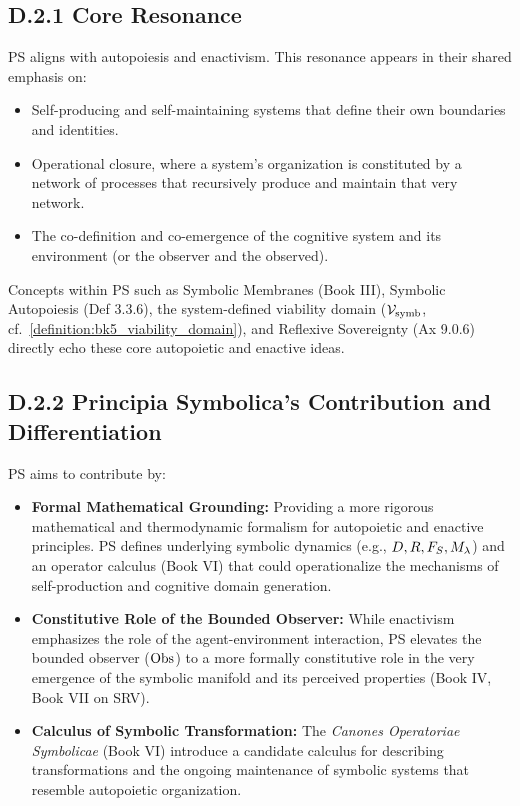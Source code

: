 \subsection*{D.2.1 Core Resonance}
\label{subsec:appD_autopoiesis_core_resonance}
PS aligns with autopoiesis and enactivism.
This resonance appears in their shared emphasis on:
\begin{itemize}
    \item Self-producing and self-maintaining systems that define their own boundaries and identities.
    \item Operational closure, where a system's organization is constituted by a network of processes that recursively produce and maintain that very network.
    \item The co-definition and co-emergence of the cognitive system and its environment (or the observer and the observed).
\end{itemize}
Concepts within PS such as Symbolic Membranes (Book III), Symbolic Autopoiesis (Def 3.3.6), the system-defined viability domain (\(\mathcal{V}_{\mathrm{symb}}\), cf.~\ref{definition:bk5_viability_domain}), and Reflexive Sovereignty (Ax 9.0.6) directly echo these core autopoietic and enactive ideas.
\subsection*{D.2.2 Principia Symbolica's Contribution and Differentiation} \label{subsec:appD_autopoiesis_contribution_differentiation}
PS aims to contribute by:
\begin{itemize}
    \item \textbf{Formal Mathematical Grounding:} 
    Providing a more rigorous mathematical and thermodynamic formalism for autopoietic and enactive principles. PS defines underlying symbolic dynamics (e.g., \(D, R, F_S, M_\lambda\)) and an operator calculus (Book VI) that could operationalize the mechanisms of self-production and cognitive domain generation.
    \item \textbf{Constitutive Role of the Bounded Observer:} 
    While enactivism emphasizes the role of the agent-environment interaction, PS elevates the bounded observer (\(\mathrm{Obs}\)) to a more formally constitutive role in the very emergence of the symbolic manifold and its perceived properties (Book IV, Book VII on SRV).
    \item \textbf{Calculus of Symbolic Transformation:} 
    The \emph{Canones Operatoriae Symbolicae} (Book VI) introduce a candidate calculus for describing transformations and the ongoing maintenance of symbolic systems  
that resemble autopoietic organization.
\end{itemize}
